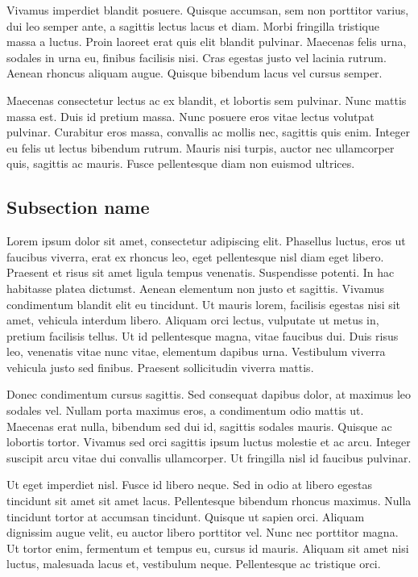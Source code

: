 Vivamus imperdiet blandit posuere. Quisque accumsan, sem non porttitor varius, dui leo semper ante, a sagittis lectus lacus et diam. Morbi fringilla tristique massa a luctus. Proin laoreet erat quis elit blandit pulvinar. Maecenas felis urna, sodales in urna eu, finibus facilisis nisi. Cras egestas justo vel lacinia rutrum. Aenean rhoncus aliquam augue. Quisque bibendum lacus vel cursus semper.

Maecenas consectetur lectus ac ex blandit, et lobortis sem pulvinar. Nunc mattis massa est. Duis id pretium massa. Nunc posuere eros vitae lectus volutpat pulvinar. Curabitur eros massa, convallis ac mollis nec, sagittis quis enim. Integer eu felis ut lectus bibendum rutrum. Mauris nisi turpis, auctor nec ullamcorper quis, sagittis ac mauris. Fusce pellentesque diam non euismod ultrices. 

\subsection{Subsection name}
Lorem ipsum dolor sit amet, consectetur adipiscing elit. Phasellus luctus, eros ut faucibus viverra, erat ex rhoncus leo, eget pellentesque nisl diam eget libero. Praesent et risus sit amet ligula tempus venenatis. Suspendisse potenti. In hac habitasse platea dictumst. Aenean elementum non justo et sagittis. Vivamus condimentum blandit elit eu tincidunt. Ut mauris lorem, facilisis egestas nisi sit amet, vehicula interdum libero. Aliquam orci lectus, vulputate ut metus in, pretium facilisis tellus. Ut id pellentesque magna, vitae faucibus dui. Duis risus leo, venenatis vitae nunc vitae, elementum dapibus urna. Vestibulum viverra vehicula justo sed finibus. Praesent sollicitudin viverra mattis.

Donec condimentum cursus sagittis. Sed consequat dapibus dolor, at maximus leo sodales vel. Nullam porta maximus eros, a condimentum odio mattis ut. Maecenas erat nulla, bibendum sed dui id, sagittis sodales mauris. Quisque ac lobortis tortor. Vivamus sed orci sagittis ipsum luctus molestie et ac arcu. Integer suscipit arcu vitae dui convallis ullamcorper. Ut fringilla nisl id faucibus pulvinar.

Ut eget imperdiet nisl. Fusce id libero neque. Sed in odio at libero egestas tincidunt sit amet sit amet lacus. Pellentesque bibendum rhoncus maximus. Nulla tincidunt tortor at accumsan tincidunt. Quisque ut sapien orci. Aliquam dignissim augue velit, eu auctor libero porttitor vel. Nunc nec porttitor magna. Ut tortor enim, fermentum et tempus eu, cursus id mauris. Aliquam sit amet nisi luctus, malesuada lacus et, vestibulum neque. Pellentesque ac tristique orci.

